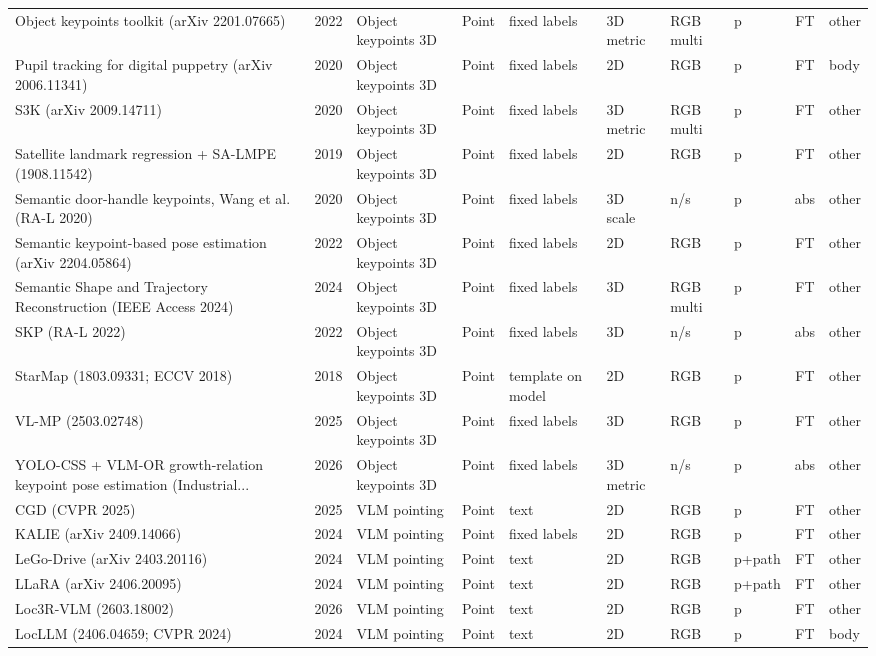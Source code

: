 {\begin{landscape}
\begin{longtable}{@{}p{4.6cm}rp{2.0cm}lllllcl@{}}
Object keypoints toolkit (arXiv 2201.07665) & 2022 & Object keypoints 3D & Point & fixed labels & 3D metric & RGB multi & p & FT & other \\
Pupil tracking for digital puppetry (arXiv 2006.11341) & 2020 & Object keypoints 3D & Point & fixed labels & 2D & RGB & p & FT & body \\
S3K (arXiv 2009.14711) & 2020 & Object keypoints 3D & Point & fixed labels & 3D metric & RGB multi & p & FT & other \\
Satellite landmark regression + SA-LMPE (1908.11542) & 2019 & Object keypoints 3D & Point & fixed labels & 2D & RGB & p & FT & other \\
Semantic door-handle keypoints, Wang et al. (RA-L 2020) & 2020 & Object keypoints 3D & Point & fixed labels & 3D scale & n/s & p & abs & other \\
Semantic keypoint-based pose estimation (arXiv 2204.05864) & 2022 & Object keypoints 3D & Point & fixed labels & 2D & RGB & p & FT & other \\
Semantic Shape and Trajectory Reconstruction (IEEE Access 2024) & 2024 & Object keypoints 3D & Point & fixed labels & 3D & RGB multi & p & FT & other \\
SKP (RA-L 2022) & 2022 & Object keypoints 3D & Point & fixed labels & 3D & n/s & p & abs & other \\
StarMap (1803.09331; ECCV 2018) & 2018 & Object keypoints 3D & Point & template on model & 2D & RGB & p & FT & other \\
VL-MP (2503.02748) & 2025 & Object keypoints 3D & Point & fixed labels & 3D & RGB & p & FT & other \\
YOLO-CSS + VLM-OR growth-relation keypoint pose estimation (Industrial... & 2026 & Object keypoints 3D & Point & fixed labels & 3D metric & n/s & p & abs & other \\
CGD (CVPR 2025) & 2025 & VLM pointing & Point & text & 2D & RGB & p & FT & other \\
KALIE (arXiv 2409.14066) & 2024 & VLM pointing & Point & fixed labels & 2D & RGB & p & FT & other \\
LeGo-Drive (arXiv 2403.20116) & 2024 & VLM pointing & Point & text & 2D & RGB & p+path & FT & other \\
LLaRA (arXiv 2406.20095) & 2024 & VLM pointing & Point & text & 2D & RGB & p+path & FT & other \\
Loc3R-VLM (2603.18002) & 2026 & VLM pointing & Point & text & 2D & RGB & p & FT & other \\
LocLLM (2406.04659; CVPR 2024) & 2024 & VLM pointing & Point & text & 2D & RGB & p & FT & body \\

\end{longtable}
\end{landscape}}
